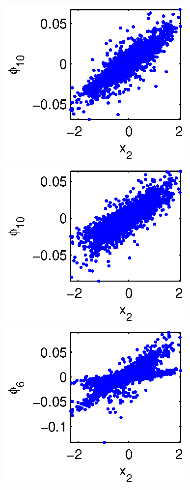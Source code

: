 \begin{figure}[!t]
\includegraphics[width=\figwidth]{data_linear_fast1}
\includegraphics[width=\figwidth]{data_linear_fast2}
\includegraphics[width=\figwidth]{data_linear_fast3}


\end{figure}
